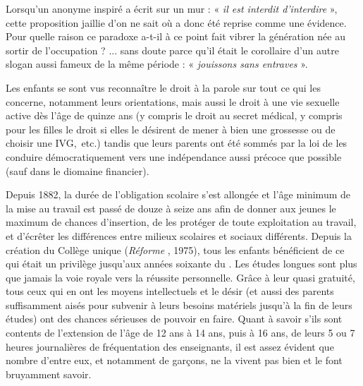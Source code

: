 \begin{table}[t]
\begin{table}[t]
 Lorsqu'un anonyme inspiré a écrit sur un mur : « \emph{il est interdit d'interdire} », cette proposition jaillie d'on ne sait où a donc été reprise comme une évidence. Pour quelle raison ce paradoxe a-t-il à ce point fait vibrer la génération née au sortir de l'occupation ? ... sans doute parce qu'il était le corollaire d'un autre slogan aussi fameux de la même période : « \emph{jouissons sans entraves} ». 

 Les enfants se sont vus reconnaître le droit à la parole sur tout ce qui les concerne, notamment leurs orientations, mais aussi le droit à une vie sexuelle active dès l'âge de quinze ans (y compris le droit au secret médical, y compris pour les filles le droit si elles le désirent de mener à bien une grossesse ou de choisir une IVG,~etc.) tandis que leurs parents ont été sommés par la loi de les conduire démocratiquement vers une indépendance aussi précoce que possible (sauf dans le diomaine financier). 

 Depuis 1882, la durée de l'obligation scolaire s'est allongée et l'âge minimum de la mise au travail est passé de douze à seize ans afin de donner aux jeunes le maximum de chances d'insertion, de les protéger de toute exploitation au travail, et d'écrêter les différences entre milieux scolaires et sociaux différents. Depuis la création du Collège unique (\emph{Réforme }, 1975), tous les enfants bénéficient de ce qui était un privilège jusqu'aux années soixante du . Les études longues sont plus que jamais la voie royale vers la réussite personnelle. Grâce à leur quasi gratuité, tous ceux qui en ont les moyens intellectuels et le désir (et aussi des parents suffisamment aisés pour subvenir à leurs besoins matériels jusqu'à la fin de leurs études) ont des chances sérieuses de pouvoir en faire. Quant à savoir s'ils sont contents de l'extension de l'âge de 12 ans à 14 ans, puis à 16 ans, de leurs 5 ou 7 heures journalières de fréquentation des enseignants, il est assez évident que nombre d'entre eux, et notamment de garçons, ne la vivent pas bien et le font bruyamment savoir.


\end{table}
\end{table}
